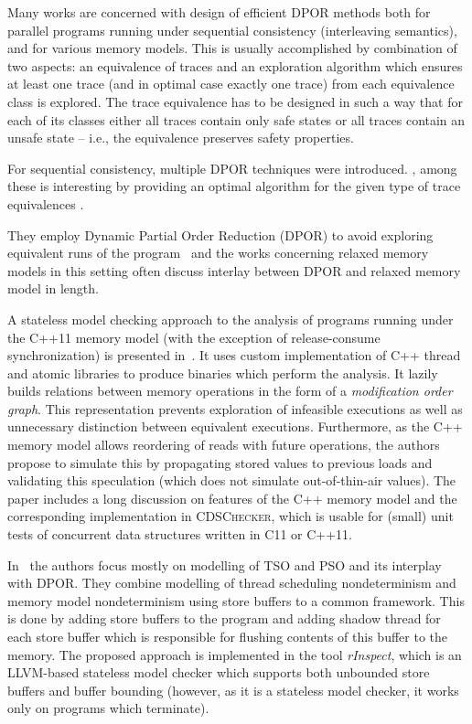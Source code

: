 Many works are concerned with design of efficient DPOR methods both for
parallel programs running under sequential consistency (interleaving
semantics), and for various memory models.
This is usually accomplished by combination of two aspects: an equivalence of
traces and an exploration algorithm which ensures at least one trace (and in
optimal case exactly one trace) from each equivalence class is explored.
The trace equivalence has to be designed in such a way that for each of its
classes either all traces contain only safe states or all traces contain an
unsafe state -- i.e., the equivalence preserves safety properties.

For sequential consistency, multiple DPOR techniques were introduced.  \cite{TODO,TODO}, among these \cite{Abdulla2014} is interesting by providing an optimal algorithm for the given type of trace equivalences . 



They employ Dynamic Partial Order Reduction (DPOR)
to avoid exploring equivalent runs of the program~\cite{Flanagan2005dpor} and the works concerning relaxed memory models
in this setting often discuss interlay between DPOR and relaxed memory
model in length.

A stateless model checking approach to the analysis of programs running
under the C++11 memory model (with the exception of release-consume
synchronization) is presented in~\cite{Norris2013}. It uses custom
implementation of C++ thread and atomic libraries to produce binaries
which perform the analysis. It lazily builds relations between memory
operations in the form of a \emph{modification order graph}. This
representation prevents exploration of infeasible executions as well as
unnecessary distinction between equivalent executions. Furthermore, as
the C++ memory model allows reordering of reads with future operations,
the authors propose to simulate this by propagating stored values to
previous loads and validating this speculation (which does not simulate
out-of-thin-air values). The paper includes a long discussion on
features of the C++ memory model and the corresponding implementation in
\textsc{CDSChecker}, which is usable for (small) unit tests of
concurrent data structures written in C11 or C++11.

In~\cite{Zhang2015} the authors focus mostly on modelling of TSO and PSO
and its interplay with DPOR. They combine modelling of thread scheduling
nondeterminism and memory model nondeterminism using store buffers to a
common framework. This is done by adding store buffers to the program
and adding shadow thread for each store buffer which is responsible for
flushing contents of this buffer to the memory. The proposed approach is
implemented in the tool \emph{rInspect}, which is an LLVM-based
stateless model checker which supports both unbounded store buffers and
buffer bounding (however, as it is a stateless model checker, it works
only on programs which terminate).

